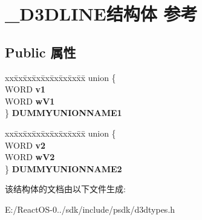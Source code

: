 \hypertarget{struct___d3_d_l_i_n_e}{}\section{\+\_\+\+D3\+D\+L\+I\+N\+E结构体 参考}
\label{struct___d3_d_l_i_n_e}
\subsection*{Public 属性}
\begin{DoxyCompactItemize}
\item 
\mbox{\label{struct___d3_d_l_i_n_e_a31b82bb45919ec2a42f2c6bd769e4a3d}} 
\begin{tabbing}
xx\=xx\=xx\=xx\=xx\=xx\=xx\=xx\=xx\=\kill
union \{\\
\>WORD {\bfseries v1}\\
\>WORD {\bfseries wV1}\\
\} {\bfseries DUMMYUNIONNAME1}\\

\end{tabbing}\item 
\mbox{\label{struct___d3_d_l_i_n_e_a36e6ef2b2b8fafd58e2ce52ec48a4d6a}} 
\begin{tabbing}
xx\=xx\=xx\=xx\=xx\=xx\=xx\=xx\=xx\=\kill
union \{\\
\>WORD {\bfseries v2}\\
\>WORD {\bfseries wV2}\\
\} {\bfseries DUMMYUNIONNAME2}\\

\end{tabbing}\end{DoxyCompactItemize}


该结构体的文档由以下文件生成\+:\begin{DoxyCompactItemize}
\item 
E\+:/\+React\+O\+S-\/0../sdk/include/psdk/d3dtypes.\+h\end{DoxyCompactItemize}
